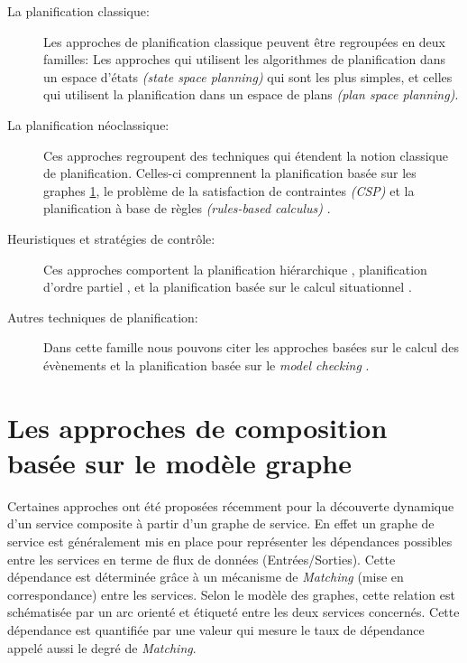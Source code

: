   \renewcommand{\descriptionlabel}[1]{\hspace{0.5cm}\textbullet~\textsf{#1}}
  \begin{description}
  \item [La planification classique:] Les approches de planification
    classique \cite{akkiraju2004executing, zeng2008dynamic} peuvent
    être regroupées en deux familles: Les approches qui
    utilisent les algorithmes de planification dans un espace d'états
    \textit{(state space planning)} qui sont les plus simples, et celles
    qui utilisent la planification dans un espace de plans \textit{(plan space planning)}.

  \item [La planification néoclassique:] Ces approches regroupent des
    techniques qui étendent la notion classique de
    planification. Celles-ci comprennent la planification basée sur les
    graphes \ref{sec:graph-base-composition}, le problème de la
    satisfaction de contraintes \textit{(CSP)}
    \cite{paik2007automatic} et la planification à base de règles
    \textit{(rules-based calculus)} \cite{medjahed2004semantic,
      rao2006mixed}.

  \item [Heuristiques et stratégies de contrôle:] Ces approches
    comportent la planification hiérarchique \cite{wu2003automating,
      sirin2004htn}, planification d'ordre partiel \cite{peer2005pop,
      klusch2005semantic}, et la planification basée sur le calcul
    situationnel \cite{mcilraith2002adapting, sohrabi2009web}.

  \item [Autres techniques de planification:] Dans cette famille nous
    pouvons citer les approches basées sur le calcul des évènements
    \cite{aydin2008automated} et la planification basée sur le
    \textit{model checking}
    \cite{pistore2004planning,pistore2005automated}.
  \end{description}
  \enddescription

  \section{Les approches de composition basée sur le modèle graphe}
  \label{sec:graph-base-composition}

  Certaines approches ont été proposées récemment pour la découverte
  dynamique d'un service composite à partir d'un graphe de service. En
  effet un graphe de service est généralement mis en place pour
  représenter les dépendances possibles entre les services en terme de
  flux de données (Entrées/Sorties). Cette dépendance est déterminée
  grâce à un mécanisme de \textit{Matching} (mise en correspondance)
  entre les services. Selon le modèle des graphes, cette relation est
  schématisée par un arc orienté et étiqueté entre les deux services
  concernés. Cette dépendance est quantifiée par une valeur qui mesure
  le taux de dépendance appelé aussi le degré de
  \textit{Matching}.\medskip

